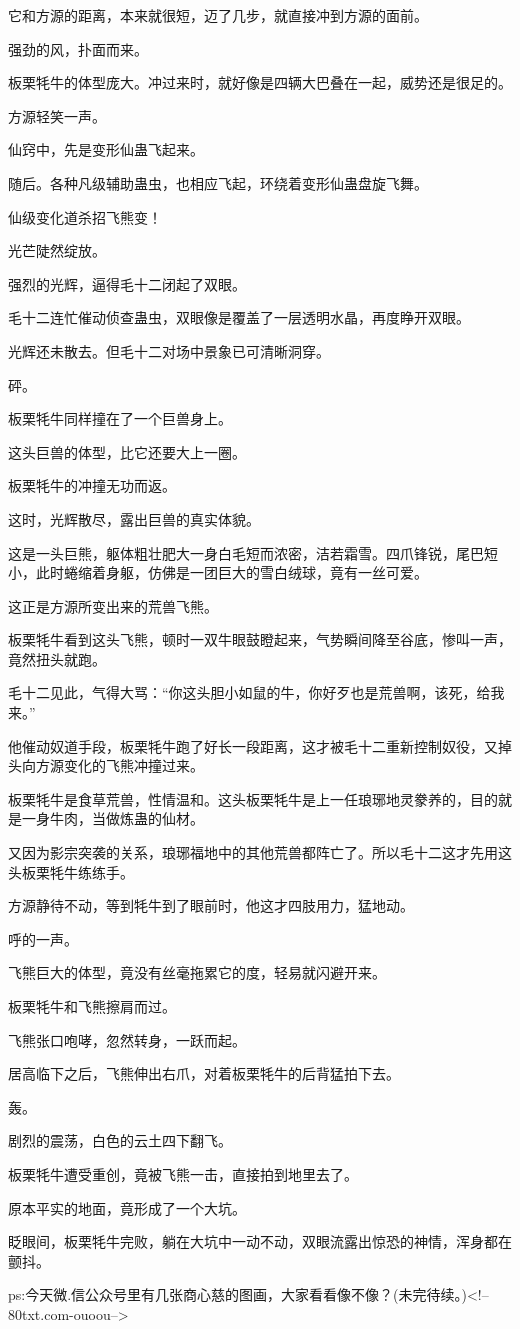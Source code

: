 \begin{this_body}
它和方源的距离，本来就很短，迈了几步，就直接冲到方源的面前。

强劲的风，扑面而来。

板栗牦牛的体型庞大。冲过来时，就好像是四辆大巴叠在一起，威势还是很足的。

方源轻笑一声。

仙窍中，先是变形仙蛊飞起来。

随后。各种凡级辅助蛊虫，也相应飞起，环绕着变形仙蛊盘旋飞舞。

仙级变化道杀招飞熊变！

光芒陡然绽放。

强烈的光辉，逼得毛十二闭起了双眼。

毛十二连忙催动侦查蛊虫，双眼像是覆盖了一层透明水晶，再度睁开双眼。

光辉还未散去。但毛十二对场中景象已可清晰洞穿。

砰。

板栗牦牛同样撞在了一个巨兽身上。

这头巨兽的体型，比它还要大上一圈。

板栗牦牛的冲撞无功而返。

这时，光辉散尽，露出巨兽的真实体貌。

这是一头巨熊，躯体粗壮肥大一身白毛短而浓密，洁若霜雪。四爪锋锐，尾巴短小，此时蜷缩着身躯，仿佛是一团巨大的雪白绒球，竟有一丝可爱。

这正是方源所变出来的荒兽飞熊。

板栗牦牛看到这头飞熊，顿时一双牛眼鼓瞪起来，气势瞬间降至谷底，惨叫一声，竟然扭头就跑。

毛十二见此，气得大骂：“你这头胆小如鼠的牛，你好歹也是荒兽啊，该死，给我来。”

他催动奴道手段，板栗牦牛跑了好长一段距离，这才被毛十二重新控制奴役，又掉头向方源变化的飞熊冲撞过来。

板栗牦牛是食草荒兽，性情温和。这头板栗牦牛是上一任琅琊地灵豢养的，目的就是一身牛肉，当做炼蛊的仙材。

又因为影宗突袭的关系，琅琊福地中的其他荒兽都阵亡了。所以毛十二这才先用这头板栗牦牛练练手。

方源静待不动，等到牦牛到了眼前时，他这才四肢用力，猛地动。

呼的一声。

飞熊巨大的体型，竟没有丝毫拖累它的度，轻易就闪避开来。

板栗牦牛和飞熊擦肩而过。

飞熊张口咆哮，忽然转身，一跃而起。

居高临下之后，飞熊伸出右爪，对着板栗牦牛的后背猛拍下去。

轰。

剧烈的震荡，白色的云土四下翻飞。

板栗牦牛遭受重创，竟被飞熊一击，直接拍到地里去了。

原本平实的地面，竟形成了一个大坑。

眨眼间，板栗牦牛完败，躺在大坑中一动不动，双眼流露出惊恐的神情，浑身都在颤抖。

ps:今天微.信公众号里有几张商心慈的图画，大家看看像不像？(未完待续。)<!--80txt.com-ouoou-->

\end{this_body}


